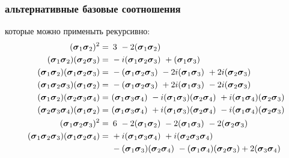 \documentclass{beamer}
\begin{document}
\begin{frame}
\frametitle{альтернативные базовые соотношения}
которые можно применыть рекурсивно:
\small
\begin{align}
  (\ssigma_1\ssigma_2)^2 = & \,\,\,  3\
  -2 (\ssigma_1\ssigma_2)				%
  \\
  (\ssigma_1\ssigma_2)(\ssigma_2\ssigma_3) = &\
  -i(\ssigma_1\ssigma_2\ssigma_3)\
  +(\ssigma_1\ssigma_3)					%
  \\
  (\ssigma_1\ssigma_2)(\ssigma_1\ssigma_2\ssigma_3) = &\
  -(\ssigma_1\ssigma_2\ssigma_3)\
  -2i(\ssigma_1\ssigma_3)\
  +2i(\ssigma_2\ssigma_3)				%
  \\
  (\ssigma_1\ssigma_2\ssigma_3)(\ssigma_1\ssigma_2) = &\
  -(\ssigma_1\ssigma_2\ssigma_3)\
  +2i(\ssigma_1\ssigma_3)\
  -2i(\ssigma_2\ssigma_3)				%
  \\
  (\ssigma_1\ssigma_2)(\ssigma_2\ssigma_3\ssigma_4) = & \
  (\ssigma_1\ssigma_3\ssigma_4)\
  -i(\ssigma_1\ssigma_3)(\ssigma_2\ssigma_4)\
  +i(\ssigma_1\ssigma_4)(\ssigma_2\ssigma_3)		%
  \\
  (\ssigma_2\ssigma_3\ssigma_4)(\ssigma_1\ssigma_2) =  &\
  (\ssigma_1\ssigma_3\ssigma_4)\
  +i(\ssigma_1\ssigma_3)(\ssigma_2\ssigma_4)\
  -i(\ssigma_1\ssigma_4)(\ssigma_2\ssigma_3)		%
  \\
  (\ssigma_1\ssigma_2\ssigma_3)^2 = &\,\,\,6\
  -2(\ssigma_1\ssigma_2)\
  -2(\ssigma_1\ssigma_3)\
  -2(\ssigma_2\ssigma_3)				%
  \\
  (\ssigma_1\ssigma_2\ssigma_3)(\ssigma_1\ssigma_2\ssigma_4) = &\
  +i(\ssigma_1\ssigma_3\ssigma_4)\
  +i(\ssigma_2\ssigma_3\ssigma_4) 		\nonumber\\  & \
  -(\ssigma_1\ssigma_3)(\ssigma_2\ssigma_4) \
  -(\ssigma_1\ssigma_4)(\ssigma_2\ssigma_3)
  +2 (\ssigma_3\ssigma_4)				%

\end{align}
\end{frame}
\end{document}
